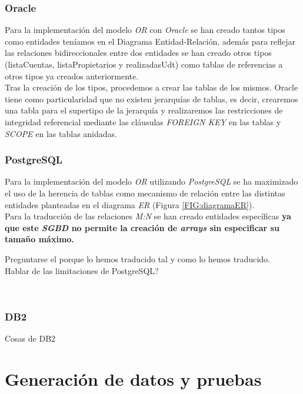\documentclass{article}
\begin{document}
\subsubsection{Oracle}
Para la implementación del modelo \emph{OR} con \emph{Oracle} se han creado tantos tipos como entidades teníamos en el Diagrama Entidad-Relación, además para reflejar las relaciones bidireccionales entre dos entidades se han creado otros tipos (listaCuentas, listaPropietarios y realizadasUdt) como tablas de referencias a otros tipos ya creados anteriormente.
\\
Tras la creación de los tipos, procedemos a crear las tablas de los mismos. Oracle tiene como particularidad que no existen jerarquías de tablas, es decir, crearemos una tabla para el supertipo de la jerarquía y realizaremos las restricciones de integridad referencial mediante las cláusulas \emph{FOREIGN KEY} en las tablas y \emph{SCOPE} en las tablas anidadas.
\\

\subsubsection{PostgreSQL}

Para la implementación del modelo \emph{OR} utilizando \emph{PostgreSQL} se ha maximizado el uso de la herencia de tablas como mecanismo de relación entre las distintas entidades planteadas en el diagrama \emph{ER} (Figura \ref{FIG:diagramaER}).\\
Para la traducción de las relaciones \emph{M:N} se han creado entidades específicas \textbf{ya que este \emph{SGBD} no permite la creación de \emph{arrays} sin especificar su tamaño máximo.}\\

\begin{Large}
	Preguntarse el porque lo hemos traducido tal y como lo hemos traducido.\\
	
	Hablar de las limitaciones de PostgreSQL?
\end{Large}
\\

\subsubsection{DB2}
Cosas de DB2
\\

\section{Generación de datos y pruebas}
\end{document}
